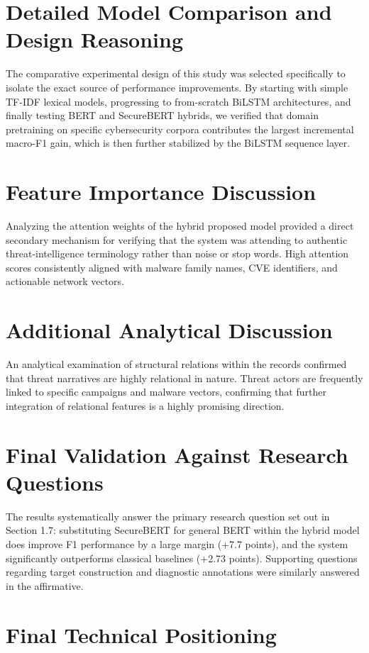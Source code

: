 \documentclass[12pt,a4paper]{report}
\begin{document}
\section{Detailed Model
Comparison and Design Reasoning}

The comparative experimental design of this study was selected
specifically to isolate the exact source of performance improvements. By
starting with simple TF-IDF lexical models, progressing to from-scratch
BiLSTM architectures, and finally testing BERT and SecureBERT hybrids,
we verified that domain pretraining on specific cybersecurity corpora
contributes the largest incremental macro-F1 gain, which is then further
stabilized by the BiLSTM sequence layer.
\section{Feature
Importance Discussion}

Analyzing the attention weights of the hybrid proposed model provided a
direct secondary mechanism for verifying that the system was attending
to authentic threat-intelligence terminology rather than noise or stop
words. High attention scores consistently aligned with malware family
names, CVE identifiers, and actionable network vectors.
\section{Additional
Analytical Discussion}

An analytical examination of structural relations within the records
confirmed that threat narratives are highly relational in nature. Threat
actors are frequently linked to specific campaigns and malware vectors,
confirming that further integration of relational features is a highly
promising direction.
\section{Final
Validation Against Research Questions}

The results systematically answer the primary research question set out
in Section 1.7: substituting SecureBERT for general BERT within the
hybrid model does improve F1 performance by a large margin (+7.7
points), and the system significantly outperforms classical baselines
(+2.73 points). Supporting questions regarding target construction and
diagnostic annotations were similarly answered in the affirmative.
\section{Final
Technical Positioning}
\end{document}
